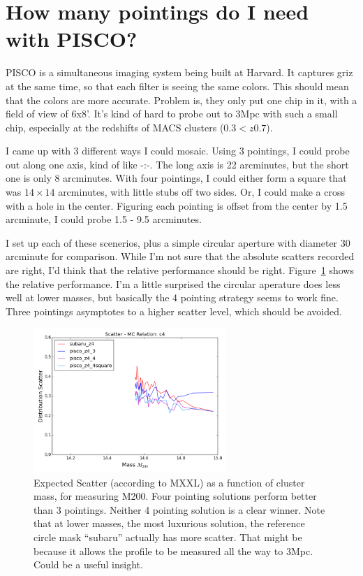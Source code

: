 \documentclass[11pt]{article}
\begin{document}
\section{How many pointings do I need with PISCO?}
\label{sec:piscoproposal}


PISCO is a simultaneous imaging system being built at Harvard. It captures griz at the same time, so that each filter is seeing the same colors. This should mean that the colors are more accurate. Problem is, they only put one chip in it, with a field of view of 6x8'. It's kind of hard to probe out to 3Mpc with such a small chip, especially at the redshifts of MACS clusters ($0.3 < z 0.7$).

I came up with 3 different ways I could mosaic. Using 3 pointings, I could probe out along one axis, kind of like -:-. The long axis is 22 arcminutes, but the short one is only 8 arcminutes. With four pointings, I could either form a square that was $14\times14$ arcminutes, with little stubs off two sides. Or, I could make a cross with a hole in the center. Figuring each pointing is offset from the center by 1.5 arcminute, I could probe 1.5 - 9.5 arcminutes.

I set up each of these scenerios, plus a simple circular aperture with diameter 30 arcminute for comparison. While I'm not sure that the absolute scatters recorded are right, I'd think that the relative performance should be right. Figure~\ref{fig:piscoscatter} shows the relative performance. I'm a little surprised the circular aperature does less well at lower masses, but basically the 4 pointing strategy seems to work fine. Three pointings asymptotes to a higher scatter level, which should be avoided.

\begin{figure}
\centering
\includegraphics[width=0.65\textwidth]{figures/piscoproposal_scatter}
\caption{Expected Scatter (according to MXXL) as a function of cluster mass, for measuring M200. Four pointing solutions perform better than 3 pointings. Neither 4 pointing solution is a clear winner. Note that at lower masses, the most luxurious solution, the reference circle mask ``subaru'' actually has more scatter. That might be because it allows the profile to be measured all the way to 3Mpc. Could be a useful insight. }
\label{fig:piscoscatter}

\end{figure}
\end{document}
